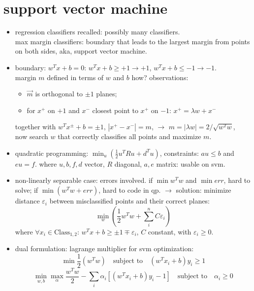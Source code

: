 \documentclass{article}
\begin{document}
\section{support vector machine}
\begin{itemize}
	\item regression classifiers recalled: possibly many classifiers. \\
		max margin classifiers: boundary that leads to the largest margin from 
		points on both sides, aka, support vector machine. 
 	\item boundary: $w^Tx+b=0$: $w^Tx+b\ge+1\rightarrow+1$, $w^Tx+b\le-1\rightarrow-1$. \\
		margin $m$ defined in terms of $w$ and $b$ how? observations: 
		\begin{itemize}
			\item $\vec m$ is orthogonal to $\pm1$ planes; 
			\item for $x^+$ on $+1$ and $x^-$ closest point to $x^+$ on $-1$:
				$x^+=\lambda w+x^-$
		\end{itemize}
		together with $w^Tx^{\pm}+b=\pm1$, $|x^+-x^-|=m$, $\rightarrow$
			$m=|\lambda w|=2/\sqrt{w^Tw}$, \\
		now search $w$ that correctly classifies all points and maximize $m$. 
	\item quadratic programming: $\min_u\left(\frac12u^TRu+d^Tu\right)$, 
		constraints: $au\le b$ and $eu=f$. where $u,b,f,d$ vector, $R$ diagonal,
		$a,e$ matrix: usable on svm. 
	\item non-linearly separable case: errors involved. 
		if $\min w^Tw$ and $\min err$, hard to solve;
		if $\min\left(w^Tw+err\right)$, hard to code in qp. 	$\rightarrow$ solution:
		minimize distance $\varepsilon_i$ between misclassified points and their correct planes:
		\begin{equation}\min_w\left(\frac12w^Tw+\sum_i^nC\varepsilon_i\right)\end{equation}
		where $\forall x_i\in \text{Class}_{1,2}$: $w^Tx+b\ge\pm1\mp\varepsilon_i$, $C$ constant,
			with $\varepsilon_i\ge0$. 
	\item dual formulation: lagrange multiplier for svm optimization: \\
		\begin{equation}
			\min\frac12(w^Tw)\quad\text{subject to}\quad (w^Tx_i+b)y_i\ge1
		\end{equation}
		\begin{equation}
			\min_{w,b}\max_{\alpha}\frac{w^Tw}2-\sum_i\alpha_i\left[\left(
			w^Tx_i+b\right)y_i-1\right]\quad\text{subject to}\quad\alpha_i\ge0

\end{equation}
\end{itemize}
\end{document}
